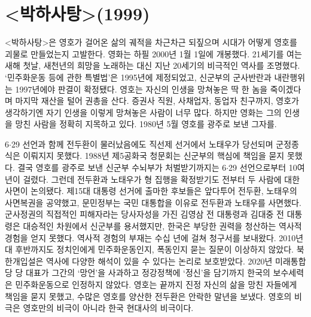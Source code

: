 \maketitle

\section*{<박하사탕>(1999)}

<박하사탕>은 영호가 걸어온 삶의 궤적을 차근차근 되짚으며 시대가 어떻게 영호를 괴물로 만들었는지 고발한다. 영화는 하필 2000년 1월 1일에 개봉했다. 21세기를 여는 새해 첫날, 새천년의 희망을 노래하는 대신 지난 20세기의 비극적인 역사를 조명했다. `\oilpal 민주화운동 등에 관한 특별법'은 1995년에 제정되었고, 신군부의 군사반란과 내란행위는 1997년에야 판결이 확정됐다. 영호는 자신의 인생을 망쳐놓은 딱 한 놈을 죽이겠다며 마지막 재산을 털어 권총을 산다. 증권사 직원, 사채업자, 동업자 친구까지, 영호가 생각하기엔 자기 인생을 이렇게 망쳐놓은 사람이 너무 많다. 하지만 영화는 그의 인생을 망친 사람을 정확히 지목하고 있다. 1980년 5월 영호를 광주로 보낸 그자를.

6$\cdot$29 선언과 함께 전두환이 물러났음에도 직선제 선거에서 노태우가 당선되며 군정종식은 이뤄지지 못했다. 1988년 제5공화국 청문회는 신군부의 핵심에 책임을 묻지 못했다. 결국 영호를 광주로 보낸 신군부 수뇌부가 처벌받기까지는 6$\cdot$29 선언으로부터 10여 년이 걸렸다. 그런데 전두환과 노태우가 형 집행을 확정받기도 전부터 두 사람에 대한 사면이 논의됐다. 제15대 대통령 선거에 출마한 후보들은 앞다투어 전두환, 노태우의 사면복권을 공약했고, 문민정부는 국민 대통합을 이유로 전두환과 노태우를 사면했다. 군사정권의 직접적인 피해자라는 당사자성을 가진 김영삼 전 대통령과 김대중 전 대통령은 대승적인 차원에서 신군부를 용서했지만, 한국은 부당한 권력을 청산하는 역사적 경험을 얻지 못했다. 역사적 경험의 부재는 수십 년에 걸쳐 청구서를 보내왔다. 2010년대 후반까지도 정치인에게  민주화운동인지, 폭동인지 묻는 질문이 이상하지 않았다. \oilpal 북한개입설은 역사에 다양한 해석이 있을 수 있다는 논리로 보호받았다. 2020년 미래통합당 당 대표가 그간의 `\oilpal 망언'을 사과하고 정강정책에 `\oilpal 정신'을 담기까지 한국의 보수세력은  민주화운동으로 인정하지 않았다. 영호는 끝까지 진정 자신의 삶을 망친 자들에게 책임을 묻지 못했고, 수많은 영호를 양산한 전두환은 안락한 말년을 보냈다. 영호의 비극은 영호만의 비극이 아니라 한국 현대사의 비극이다.

